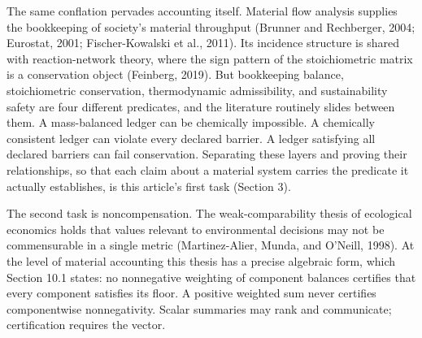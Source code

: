\documentclass[11pt]{article}
\begin{document}
The same conflation pervades accounting itself. Material flow analysis
supplies the bookkeeping of society's material throughput (Brunner and
Rechberger, 2004; Eurostat, 2001; Fischer-Kowalski et al., 2011). Its
incidence structure is shared with reaction-network theory, where the
sign pattern of the stoichiometric matrix is a conservation object
(Feinberg, 2019). But bookkeeping balance, stoichiometric conservation,
thermodynamic admissibility, and sustainability safety are four
different predicates, and the literature routinely slides between them.
A mass-balanced ledger can be chemically impossible. A chemically
consistent ledger can violate every declared barrier. A ledger
satisfying all declared barriers can fail conservation. Separating these
layers and proving their relationships, so that each claim about a
material system carries the predicate it actually establishes, is this
article's first task (Section 3).

The second task is noncompensation. The weak-comparability thesis of
ecological economics holds that values relevant to environmental
decisions may not be commensurable in a single metric (Martinez-Alier,
Munda, and O'Neill, 1998). At the level of material accounting this
thesis has a precise algebraic form, which Section 10.1 states: no
nonnegative weighting of component balances certifies that every
component satisfies its floor. A positive weighted sum never certifies
componentwise nonnegativity. Scalar summaries may rank and communicate;
certification requires the vector.
\end{document}
